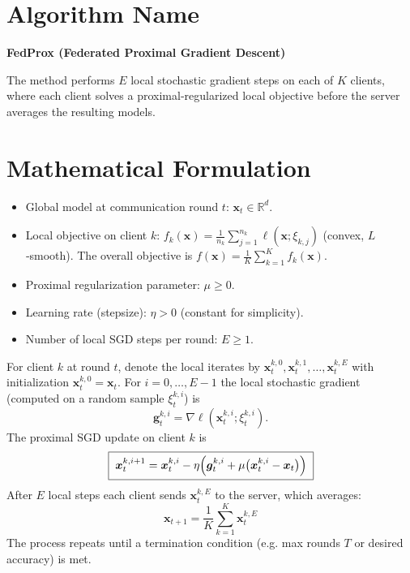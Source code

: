 \documentclass{article}
\newcommand{\R}{\mathbb{R}}
\begin{document}
\section*{Algorithm Name}
\textbf{FedProx (Federated Proximal Gradient Descent)}  

The method performs $E$ local stochastic gradient steps on each of $K$ clients,
where each client solves a proximal‐regularized local objective before the
server averages the resulting models.

\section*{Mathematical Formulation}
\begin{itemize}
    \item Global model at communication round $t$: $\bm{x}_t\in\R^{d}$.
    \item Local objective on client $k$: $f_k(\bm{x}) = \frac{1}{n_k}\sum_{j=1}^{n_k} \ell(\bm{x};\xi_{k,j})$
      (convex, $L$‑smooth).  The overall objective is $f(\bm{x})=\frac1K\sum_{k=1}^K f_k(\bm{x})$.
    \item Proximal regularization parameter: $\mu\ge 0$.
    \item Learning rate (stepsize): $\eta>0$ (constant for simplicity).
    \item Number of local SGD steps per round: $E\ge 1$.
\end{itemize}

For client $k$ at round $t$, denote the local iterates by
$\bm{x}_{t}^{k,0},\bm{x}_{t}^{k,1},\ldots,\bm{x}_{t}^{k,E}$ with
initialization $\bm{x}_{t}^{k,0}=\bm{x}_t$.
For $i=0,\ldots,E-1$ the local stochastic gradient (computed on a random sample
$\xi_{t}^{k,i}$) is
\[
\bm{g}_{t}^{k,i}= \nabla \ell(\bm{x}_{t}^{k,i};\xi_{t}^{k,i}) .
\]
The proximal SGD update on client $k$ is
\begin{equation}
\boxed{\;
\bm{x}_{t}^{k,i+1}
   = \bm{x}_{t}^{k,i}
   - \eta\Bigl(\bm{g}_{t}^{k,i}+ \mu\bigl(\bm{x}_{t}^{k,i}-\bm{x}_{t}\bigr)\Bigr)
\;}
\label{eq:local_update}
\end{equation}
After $E$ local steps each client sends $\bm{x}_{t}^{k,E}$ to the server,
which averages:
\begin{equation}
\boxed{\;
\bm{x}_{t+1}= \frac1K\sum_{k=1}^{K}\bm{x}_{t}^{k,E}
\;}
\label{eq:global_average}
\end{equation}
The process repeats until a termination condition (e.g. max rounds $T$ or
desired accuracy) is met.
\end{document}
